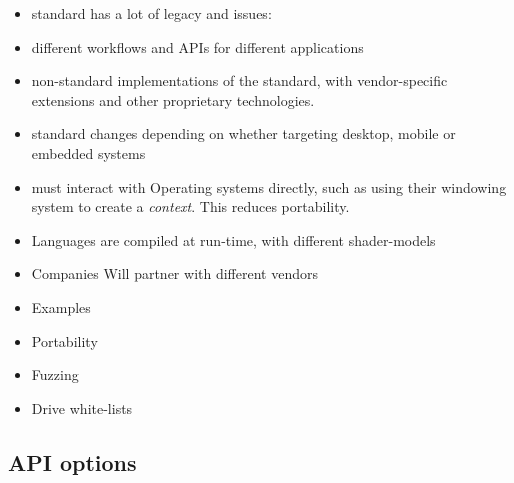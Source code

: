 \documentclass[a4paper,12pt,twoside,openright]{report}
\begin{document}
\begin{itemize}

    \item standard has a lot of legacy and issues:

        \item different workflows and APIs for different applications

        \item non-standard implementations of the standard, with
        vendor-specific extensions and other proprietary technologies.

    \item standard changes depending on whether targeting desktop, mobile
    or embedded systems

    \item must interact with Operating systems directly, such as using
    their windowing system to create a \textit{context}. This reduces
    portability.

    \item Languages are compiled at run-time, with different shader-models

    \item Companies Will partner with different vendors

    \item Examples

    \item Portability

    \item Fuzzing \cite{GLFuzz}

    \item Drive white-lists \cite{NVIDIAInternshipLessons}

\end{itemize}

\subsection{API options}

\label{sec:api_options}
\end{document}
